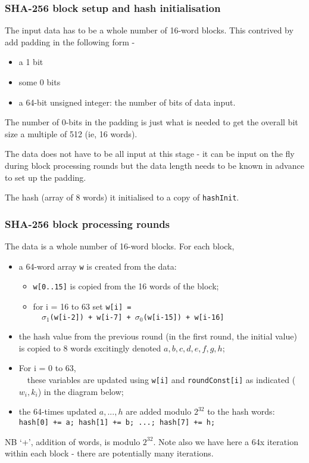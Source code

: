 \documentclass[10pt, hyperref={pdfpagelabels=false}]{beamer}
\begin{document}
\begin{frame}
\frametitle{SHA-256 block setup and hash initialisation}
The input data has to be a whole number of 16-word blocks. This contrived by add padding in the following form -
\begin{itemize}
\item a 1 bit
\item some 0 bits
\item a 64-bit unsigned integer: the number of bits of data input.
\end{itemize}

The number of 0-bits in the padding is just what is needed to get the overall bit size a multiple of 512 (ie, 16 words).

The data does not have to be all input at this stage - it can be input on the fly during block processing rounds but the data length needs to be known in advance to set up the padding. 

The hash (array of 8 words) it initialised to a copy of \texttt{\color{brown}hashInit}. 
\end{frame}

\begin{frame}
\frametitle{SHA-256 block processing rounds}
The data is a whole number of 16-word blocks. For each block,
\begin{itemize}
\item a 64-word array \texttt{\color{brown}w} is created from the data:
  \begin{itemize}
  \item \texttt{\color{brown}w[0..15]} is copied from the 16 words of the block;
  \item for i = 16 to 63 set \texttt{\color{brown}w[i] =\\~~$\sigma_1$(w[i-2]) + w[i-7] + $\sigma_0$(w[i-15]) + w[i-16]}
  \end{itemize}
\item the hash value from the previous round (in the first round, the initial value) is copied to 8 words excitingly denoted $a, b, c, d, e, f, g, h$;
\item For i = 0 to 63,\\~~these variables are updated using \texttt{\color{brown}w[i]} and \texttt{\color{brown}roundConst[i]} as indicated ($w_i, k_i$) in the diagram below;
\item the 64-times updated $a, ..., h$ are added modulo $2^{32}$ to the hash words:\\
\texttt{\color{brown}hash[0] += a; hash[1] += b; ...; hash[7] += h;}
\end{itemize}
NB `+', addition of words, is modulo $2^{32}$. Note also we have here a 64x iteration within each block - there are potentially many iterations.
\end{frame}
\end{document}
